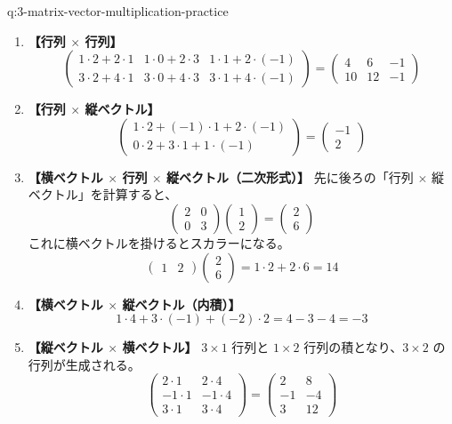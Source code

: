 \documentclass[
  pandoc]{bxjsarticle}
\providecommand{\tightlist}{%
  \setlength{\itemsep}{0pt}\setlength{\parskip}{0pt}}
\begin{document}
\begin{answerbox}[phantomlabel=a:3-matrix-vector-multiplication-practice]{q:3-matrix-vector-multiplication-practice}

\begin{enumerate}
\def\labelenumi{\arabic{enumi}.}
\tightlist
\item
  \textbf{【行列 \(\times\) 行列】} \[
  \begin{pmatrix} 1 \cdot 2 + 2 \cdot 1 & 1 \cdot 0 + 2 \cdot 3 & 1 \cdot 1 + 2 \cdot (-1) \\ 3 \cdot 2 + 4 \cdot 1 & 3 \cdot 0 + 4 \cdot 3 & 3 \cdot 1 + 4 \cdot (-1) \end{pmatrix} = \begin{pmatrix} 4 & 6 & -1 \\ 10 & 12 & -1 \end{pmatrix}
  \]
\item
  \textbf{【行列 \(\times\) 縦ベクトル】} \[
  \begin{pmatrix} 1 \cdot 2 + (-1) \cdot 1 + 2 \cdot (-1) \\ 0 \cdot 2 + 3 \cdot 1 + 1 \cdot (-1) \end{pmatrix} = \begin{pmatrix} -1 \\ 2 \end{pmatrix}
  \]
\item
  \textbf{【横ベクトル \(\times\) 行列 \(\times\)
  縦ベクトル（二次形式）】} 先に後ろの「行列 \(\times\)
  縦ベクトル」を計算すると、 \[
  \begin{pmatrix} 2 & 0 \\ 0 & 3 \end{pmatrix} \begin{pmatrix} 1 \\ 2 \end{pmatrix} = \begin{pmatrix} 2 \\ 6 \end{pmatrix}
  \] これに横ベクトルを掛けるとスカラーになる。 \[
  \begin{pmatrix} 1 & 2 \end{pmatrix} \begin{pmatrix} 2 \\ 6 \end{pmatrix} = 1 \cdot 2 + 2 \cdot 6 = 14
  \]
\item
  \textbf{【横ベクトル \(\times\) 縦ベクトル（内積）】} \[
  1 \cdot 4 + 3 \cdot (-1) + (-2) \cdot 2 = 4 - 3 - 4 = -3
  \]
\item
  \textbf{【縦ベクトル \(\times\) 横ベクトル】} \(3 \times 1\) 行列と
  \(1 \times 2\) 行列の積となり、\(3 \times 2\) の行列が生成される。 \[
  \begin{pmatrix} 2 \cdot 1 & 2 \cdot 4 \\ -1 \cdot 1 & -1 \cdot 4 \\ 3 \cdot 1 & 3 \cdot 4 \end{pmatrix} = \begin{pmatrix} 2 & 8 \\ -1 & -4 \\ 3 & 12 \end{pmatrix}
  \]
\end{enumerate}


\end{answerbox}
\end{document}
